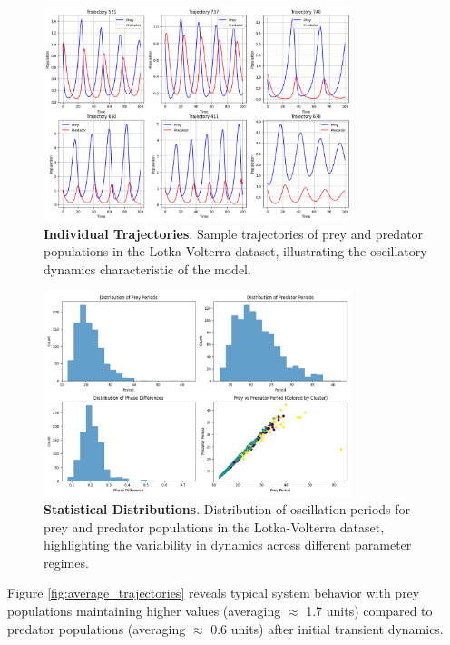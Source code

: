 \documentclass{article}
\begin{document}
\begin{figure}[H]
    \centering
    \includegraphics[width=0.8\textwidth]{sample}
    \caption{\textbf{Individual Trajectories}. Sample trajectories of prey and predator populations in the Lotka-Volterra dataset, illustrating the oscillatory dynamics characteristic of the model.}
    \label{fig:trajectories}
\end{figure}


\begin{figure} [H]
    \centering
    \includegraphics[width=0.8\textwidth]{period_distributions}
    \caption{\textbf{Statistical Distributions}. Distribution of oscillation periods for prey and predator populations in the Lotka-Volterra dataset, highlighting the variability in dynamics across different parameter regimes. }
    \label{fig:periods}
\end{figure}

Figure \ref{fig:average_trajectories} reveals typical system behavior with prey populations maintaining higher values (averaging $\approx$ 1.7 units) compared to predator populations (averaging $\approx$ 0.6 units) after initial transient dynamics.
\end{document}
